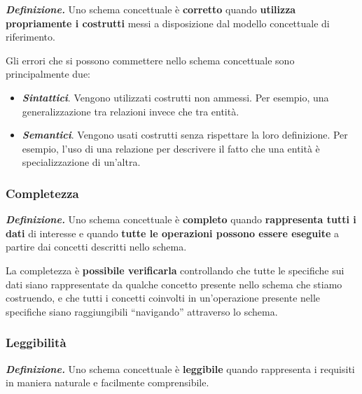 \documentclass[a4paper]{article}
\newcommand{\dquotes}[1]{``#1''}
\begin{document}
	\textcolor{Red3}{\textbf{\emph{Definizione.}}} Uno schema concettuale è \textbf{corretto} quando \textbf{utilizza propriamente i costrutti} messi a disposizione dal modello concettuale di riferimento.\newline
	
	\noindent
	Gli errori che si possono commettere nello schema concettuale sono principalmente due:
	
	\begin{itemize}
		\item \textcolor{Red3}{\textbf{\emph{Sintattici}}}. Vengono utilizzati costrutti non ammessi. \textcolor{Green4}{Per esempio}, una generalizzazione tra relazioni invece che tra entità.
		
		\item \textcolor{Red3}{\textbf{\emph{Semantici}}}. Vengono usati costrutti senza rispettare la loro definizione. \textcolor{Green4}{Per esempio}, l'uso di una relazione per descrivere il fatto che una entità è specializzazione di un'altra.
	\end{itemize}
	
	\subsubsection{Completezza}\label{completezza}
	
	\textcolor{Red3}{\textbf{\emph{Definizione.}}} Uno schema concettuale è \textbf{completo} quando \textbf{rappresenta tutti i dati} di interesse e quando \textbf{tutte le operazioni possono essere eseguite} a partire dai concetti descritti nello schema.\newline
	
	\noindent
	La completezza è \textbf{possibile verificarla} controllando che tutte le specifiche sui dati siano rappresentate da qualche concetto presente nello schema che stiamo costruendo, e che tutti i concetti coinvolti in un'operazione presente nelle specifiche siano raggiungibili \dquotes{navigando} attraverso lo schema.
	
	\subsubsection{Leggibilità}\label{leggibilità}
	
	\textcolor{Red3}{\textbf{\emph{Definizione.}}} Uno schema concettuale è \textbf{leggibile} quando rappresenta i requisiti in maniera naturale e facilmente comprensibile.\newline
	
\end{document}
